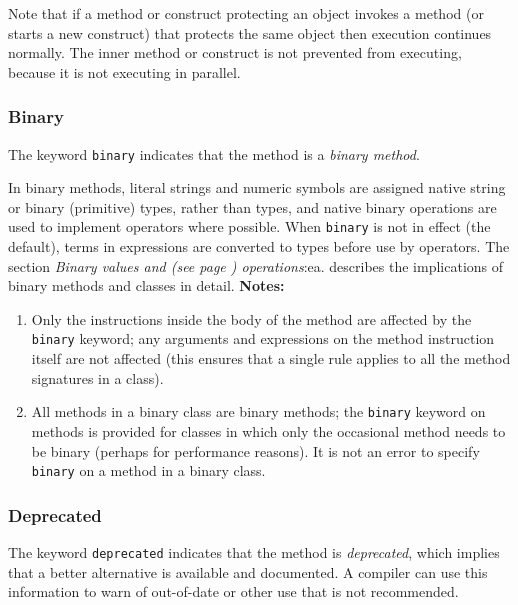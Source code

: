 Note that if a method or construct protecting an object invokes a method
(or starts a new construct) that protects the same object then execution
continues normally.  The inner method or construct is not prevented from
executing, because it is not executing in parallel.
\subsubsection{Binary}\label{refbinme}
 
The keyword \texttt{binary} indicates that the method is a \emph{binary
method}.
 
In binary methods, literal strings and numeric symbols are assigned
native string or binary (primitive) types, rather than \nr{} types,
and native binary operations are used to implement operators where
possible.
When \texttt{binary} is not in effect (the default), terms in
expressions are converted to \nr{} types before use by operators.
The section  \emph{Binary values and (see page \pageref{refbinary}) 
operations}:ea. describes the implications of binary methods and
classes in detail.
 \textbf{Notes:}
\begin{enumerate}
\item 
Only the instructions inside the body of the method are affected by the
\texttt{binary} keyword; any arguments and expressions on the method
instruction itself are not affected (this ensures that a single rule
applies to all the method signatures in a class).
\item 
All methods in a binary class are binary methods; the \texttt{binary}
keyword on methods is provided for classes in which only the occasional
method needs to be binary (perhaps for performance reasons).
It is not an error to specify \texttt{binary} on a method in a binary
class.
\end{enumerate}
\subsubsection{Deprecated}\label{refdepme}
 
The keyword \texttt{deprecated} indicates that the method
is \emph{deprecated}, which implies that a better alternative is
available and documented.  A compiler can use this information to warn
of out-of-date or other use that is not recommended.
 
